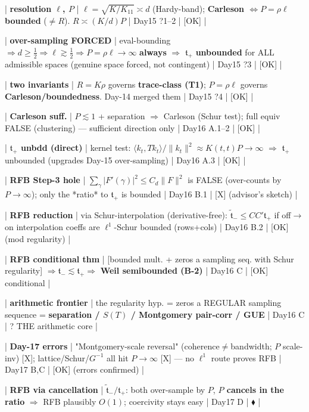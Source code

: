 \documentclass[10pt]{article}
\begin{document}
| \textbf{resolution $\ell$, $P$} | $\ell=\sqrt{K/K_{11}}\asymp d$ (Hardy-band); \textbf{Carleson $\iff P=\rho\ell$ bounded} ($\ne R$). $R\asymp(K/d)P$ | Day15 ?1--2 | [OK] |\par
| \textbf{over-sampling FORCED} | eval-bounding $\Rightarrow d\ge\tfrac12\Rightarrow\ell\gtrsim\tfrac12\Rightarrow P=\rho\ell\to\infty$ \textbf{always} \ensuremath{\Rightarrow} $\mathfrak t_+$ \textbf{unbounded} for ALL admissible spaces (genuine space forced, not contingent) | Day15 ?3 | [OK] |\par
| \textbf{two invariants} | $R=K\rho$ governs \textbf{trace-class (T1)}; $P=\rho\ell$ governs \textbf{Carleson/boundedness}. Day-14 merged them | Day15 ?4 | [OK] |\par
| \textbf{Carleson suff.} | $P\lesssim1$ + separation $\Rightarrow$ Carleson (Schur test); full equiv FALSE (clustering) --- sufficient direction only | Day16 A.1--2 | [OK] |\par
| \textbf{$\mathfrak t_+$ unbdd (direct)} | kernel test: $\langle k_t,Tk_t\rangle/\|k_t\|^2\approx K(t,t)P\to\infty$ \ensuremath{\Rightarrow} $\mathfrak t_+$ unbounded (upgrades Day-15 over-sampling) | Day16 A.3 | [OK] |\par
| \textbf{RFB Step-3 hole} | $\sum_\gamma|F'(\gamma)|^2\le C_d\|F\|^2$ is FALSE (over-counts by $P\to\infty$); only the *ratio* to $\mathfrak t_+$ is bounded | Day16 B.1 | [X] (advisor's sketch) |\par
| \textbf{RFB reduction} | via Schur-interpolation (derivative-free): $\widetilde{\mathfrak t}_-\le CC'\mathfrak t_+$ if off\ensuremath{\to}on interpolation coeffs are $\ell^1$-Schur bounded (rows+cols) | Day16 B.2 | [OK] (mod regularity) |\par
| \textbf{RFB conditional thm} | [bounded mult. + zeros a sampling seq. with Schur regularity] $\Rightarrow\mathfrak t_-\lesssim\mathfrak t_+\Rightarrow$ \textbf{Weil semibounded (B-2)} | Day16 C | [OK] conditional |\par
| \textbf{arithmetic frontier} | the regularity hyp. = zeros a REGULAR sampling sequence = \textbf{separation / $S(T)$ / Montgomery pair-corr / GUE} | Day16 C | ? THE arithmetic core |\par
| \textbf{Day-17 errors} | "Montgomery-scale reversal" (coherence\ensuremath{\ne}bandwidth; $P$ scale-inv) [X]; lattice/Schur/$G^{-1}$ all hit $P\to\infty$ [X] --- no $\ell^1$ route proves RFB | Day17 B,C | [OK] (errors confirmed) |\par
| \textbf{RFB via cancellation} | $\widetilde{\mathfrak t}_-/\mathfrak t_+$: both over-sample by $P$, \textbf{$P$ cancels in the ratio} \ensuremath{\Rightarrow} RFB plausibly $O(1)$; coercivity stays easy | Day17 D | $\blacklozenge$ |\par
\end{document}
